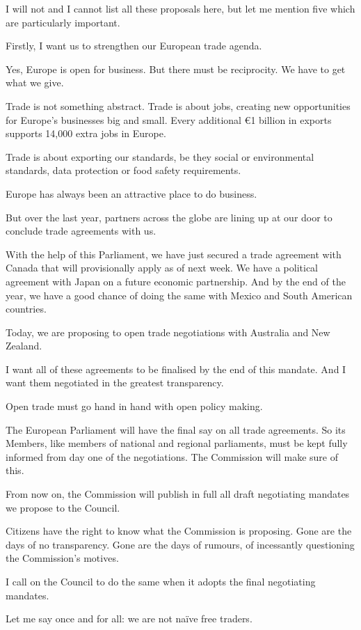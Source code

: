\documentclass[a4paper,11pt]{article}
\begin{document}
I will not and I cannot list all these proposals here, but let me mention five which are particularly important.

Firstly, I want us to strengthen our European trade agenda.

Yes, Europe is open for business. But there must be reciprocity. We have to get what we give.

Trade is not something abstract. Trade is about jobs, creating new opportunities for Europe's businesses big and small. Every additional \euro1 billion in exports supports 14,000 extra jobs in Europe.

Trade is about exporting our standards, be they social or environmental standards, data protection or food safety requirements.

Europe has always been an attractive place to do business.

But over the last year, partners across the globe are lining up at our door to conclude trade agreements with us.

With the help of this Parliament, we have just secured a trade agreement with Canada that will provisionally apply as of next week. We have a political agreement with Japan on a future economic partnership. And by the end of the year, we have a good chance of doing the same with Mexico and South American countries.

Today, we are proposing to open trade negotiations with Australia and New Zealand.

I want all of these agreements to be finalised by the end of this mandate. And I want them negotiated in the greatest transparency.

Open trade must go hand in hand with open policy making.

The European Parliament will have the final say on all trade agreements. So its Members, like members of national and regional parliaments, must be kept fully informed from day one of the negotiations. The Commission will make sure of this.

From now on, the Commission will publish in full all draft negotiating mandates we propose to the Council.

Citizens have the right to know what the Commission is proposing. Gone are the days of no transparency. Gone are the days of rumours, of incessantly questioning the Commission's motives.

I call on the Council to do the same when it adopts the final negotiating mandates.

Let me say once and for all: we are not naïve free traders.
\end{document}

